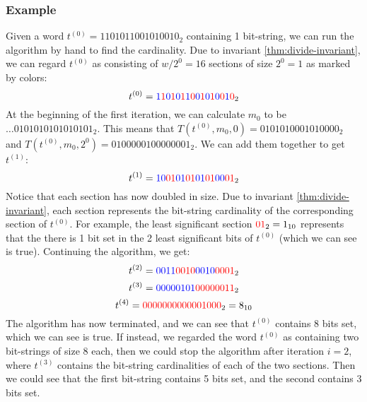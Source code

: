 \subsubsection{Example}
Given a word $t^{(0)}=1101011001010010_2$ containing 1 bit-string, we can run the algorithm by hand to find the cardinality. Due to invariant \ref{thm:divide-invariant}, we can regard $t^{(0)}$ as consisting of $w/2^0=16$ sections of size $2^0=1$ as marked by colors:\\
$$t^{(0)}=\color{blue}1\color{red}1\color{blue}0\color{red}1\color{blue}0\color{red}1\color{blue}1\color{red}0\color{blue}0\color{red}1\color{blue}0\color{red}1\color{blue}0\color{red}0\color{blue}1\color{red}0_{\color{black}2}$$
At the beginning of the first iteration, we can calculate $m_0$ to be $\dots0101010101010101_2$. This means that $T(t^{(0)}, m_0, 0)=0101010001010000_2$ and $T(t^{(0)}, m_0, 2^0)=0100000100000001_2$.
We can add them together to get $t^{(1)}$:
$$t^{(1)}=\color{blue}10\color{red}01\color{blue}01\color{red}01\color{blue}01\color{red}01\color{blue}00\color{red}01_{\color{black}2}$$
Notice that each section has now doubled in size. Due to invariant \ref{thm:divide-invariant}, each section represents the bit-string cardinality of the corresponding section of $t^{(0)}$. For example, the least significant section $\color{red}01\color{black}_2 = 1_{10}$ represents that the there is 1 bit set in the 2 least significant bits of $t^{(0)}$ (which we can see is true). Continuing the algorithm, we get:
$$t^{(2)}=\color{blue}0011\color{red}0010\color{blue}0010\color{red}0001\color{black}_2$$
$$t^{(3)}=\color{blue}00000101\color{red}00000011\color{black}_2$$
$$t^{(4)}=\color{red}0000000000001000\color{black}_2 = 8_{10}$$
The algorithm has now terminated, and we can see that $t^{(0)}$ contains 8 bits set, which we can see is true.
If instead, we regarded the word $t^{(0)}$ as containing two bit-strings of size $8$ each, then we could stop the algorithm after iteration $i=2$, where $t^{(3)}$ contains the bit-string cardinalities of each of the two sections. Then we could see that the first bit-string contains 5 bits set, and the second contains 3 bits set.

% 
